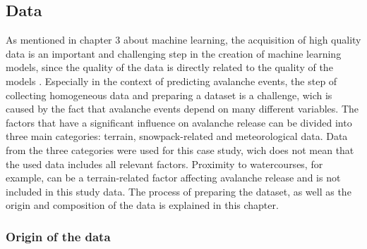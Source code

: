 \documentclass[../masterarbeit.tex]{subfiles}
\begin{document}
	




\subsection{Data}
As mentioned in chapter 3 about machine learning, the acquisition of high quality data is an important and challenging step in the creation of machine learning models, since the quality of the data is directly related to the quality of the models \textcite[]{SUBASI202091}. Especially in the context of predicting avalanche events, the step of collecting homogeneous data and preparing a dataset is a challenge, wich is caused by the fact that avalanche events depend on many different variables. The factors that have a significant influence on avalanche release can be divided into three main categories: terrain, snowpack-related and meteorological data.\autocite[]{Bahram:2019} Data from the three categories were used for this case study, wich does not mean that the used data includes all relevant factors. Proximity to watercourses, for example, can be a terrain-related factor affecting avalanche release \textcite[]{Bahram:2019} and is not included in this study data. The process of preparing the dataset, as well as the origin and composition of the data is explained in this chapter.

\subsubsection{Origin of the data}
\end{document}
